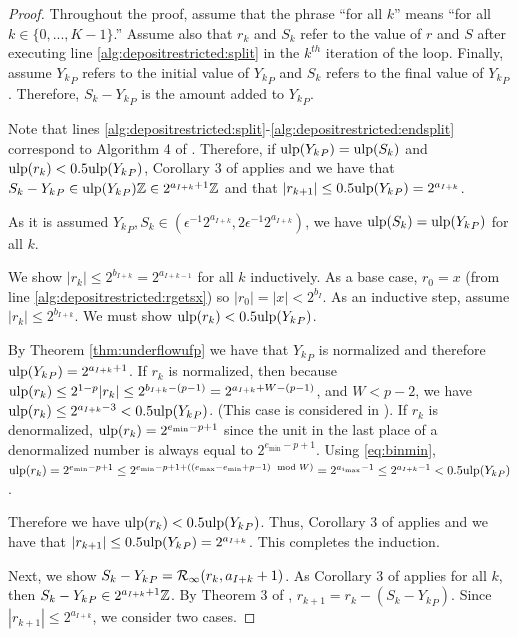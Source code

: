       \begin{proof}
        Throughout the proof, assume that the phrase ``for all $k$'' means ``for all $k \in \{0, ..., K - 1\}$.'' Assume also that $r_k$ and $S_k$ refer to the value of $r$ and $S$ after executing line \ref{alg:depositrestricted:split} in the $k^{th}$ iteration of the loop. Finally, assume ${Y_k}_P$ refers to the initial value of ${Y_k}_P$ and $S_k$ refers to the final value of ${Y_k}_P$. Therefore, $S_k - {Y_k}_P$ is the amount added to ${Y_k}_P$.

        Note that lines \ref{alg:depositrestricted:split}-\ref{alg:depositrestricted:endsplit} correspond to Algorithm 4 of \cite{repsum}.
        Therefore, if $\text{ulp}({Y_k}_P) = \text{ulp}(S_k)$ and $\text{ulp}(r_k) < 0.5\text{ulp}({Y_k}_P)$, Corollary 3 of \cite{repsum} applies and we have that $S_k - {Y_k}_P \in \text{ulp}({Y_k}_P)\mathbb{Z} \in 2^{a_{I + k} + 1}\mathbb{Z}$ and that $|r_{k + 1}| \leq 0.5\text{ulp}({Y_k}_P) = 2^{a_{I + k}}$.

        As it is assumed ${Y_k}_P, S_k \in (\epsilon^{-1}  2^{a_{I + k}}, 2  \epsilon^{-1}  2^{a_{I + k}})$, we have $\text{ulp}(S_k) = \text{ulp}({Y_k}_P)$ for all $k$.

        We show $|r_k| \leq 2^{b_{I + k}} = 2^{a_{I + k - 1}}$ for all $k$ inductively. As a base case, $r_0 = x$ (from line \ref{alg:depositrestricted:rgetsx}) so $|r_0| = |x| < 2^{b_{I}}$.
        As an inductive step, assume $|r_k| \leq 2^{b_{I + k}}$. We must show $\text{ulp}(r_k) < 0.5\text{ulp}({Y_k}_P)$.

        By Theorem \ref{thm:underflowufp} we have that ${Y_k}_P$ is normalized and therefore $\text{ulp}({Y_k}_P) = 2^{a_{I + k} + 1}$.
        If $r_k$ is normalized, then because $\text{ulp}(r_k) \leq 2^{1 - p}|r_k| \leq 2^{b_{I + k} - (p - 1)} = 2^{a_{I + k} + W - (p - 1)}$, and $W < p - 2$, we have $\text{ulp}(r_k) \leq 2^{a_{I + k} - 3} < 0.5\text{ulp}({Y_k}_P)$. (This case is considered in \cite{repsum}).
      If $r_k$ is denormalized, $\text{ulp}(r_k) = 2^{e_{\text{min}} - p + 1}$ since the unit in the last place of a denormalized number is always equal to $2^{e_{\min} - p + 1}$. Using \eqref{eq:binmin}, $\text{ulp}(r_k) = 2^{e_{\text{min}} - p + 1} \leq 2^{e_{\text{min}} - p + 1 + ((e_{\text{max}} - e_{\text{min}} + p - 1) \mod W)} = 2^{a_{i_{\text{max}}} - 1} \leq 2^{a_{I + k} - 1} < 0.5\text{ulp}({Y_k}_P)$.

        Therefore we have $\text{ulp}(r_k) < 0.5\text{ulp}({Y_k}_P)$. Thus, Corollary 3 of \cite{repsum} applies and we have that $|r_{k + 1}| \leq 0.5\text{ulp}({Y_k}_P) = 2^{a_{I + k}}$. This completes the induction.

        Next, we show $S_k - {Y_k}_P = \mathcal{R}_\text{$\infty$}(r_k, a_{I + k} + 1)$. As Corollary 3 of \cite{repsum} applies for all $k$, then $S_k - {Y_k}_P \in 2^{a_{I + k} + 1}\mathbb{Z}$. By Theorem 3 of \cite{repsum}, $r_{k + 1} = r_k - (S_k - {Y_k}_P)$. Since $|r_{k + 1}| \leq 2^{a_{I + k}}$, we consider two cases.


\end{proof}
